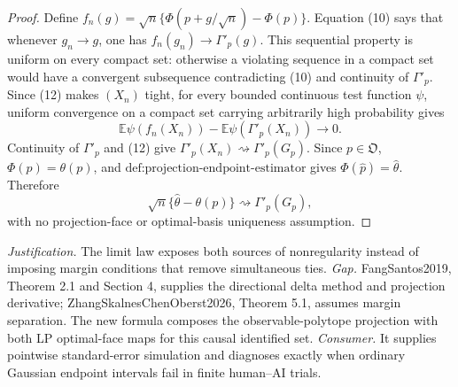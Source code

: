 \documentclass{article}
\begin{document}
\begin{proof}
Define \(f_n(g)=\sqrt n\{\Phi(p+g/\sqrt n)-\Phi(p)\}\).  Equation (10) says that whenever \(g_n\to g\), one has \(f_n(g_n)\to\Gamma'_p(g)\).  This sequential property is uniform on every compact set: otherwise a violating sequence in a compact set would have a convergent subsequence contradicting (10) and continuity of \(\Gamma'_p\).  Since (12) makes \((X_n)\) tight, for every bounded continuous test function \(\psi\), uniform convergence on a compact set carrying arbitrarily high probability gives
\[
\mathbb E\psi(f_n(X_n))-\mathbb E\psi(\Gamma'_p(X_n))\longrightarrow0.
\]
Continuity of \(\Gamma'_p\) and (12) give \(\Gamma'_p(X_n)\rightsquigarrow\Gamma'_p(G_p)\).  Since \(p\in\mathfrak O\), \(\Phi(p)=\theta(p)\), and \(\text{def:projection-endpoint-estimator}\) gives \(\Phi(\widehat p)=\widehat\theta\).  Therefore
\[
\sqrt n\{\widehat\theta-\theta(p)\}
\rightsquigarrow\Gamma'_p(G_p),
\]
with no projection-face or optimal-basis uniqueness assumption.
\end{proof}
\par\smallskip\noindent \textit{Justification.} The limit law exposes both sources of nonregularity instead of imposing margin conditions that remove simultaneous ties. \textit{Gap.} FangSantos2019, Theorem 2.1 and Section 4, supplies the directional delta method and projection derivative; ZhangSkalnesChenOberst2026, Theorem 5.1, assumes margin separation. The new formula composes the observable-polytope projection with both LP optimal-face maps for this causal identified set. \textit{Consumer.} It supplies pointwise standard-error simulation and diagnoses exactly when ordinary Gaussian endpoint intervals fail in finite human--AI trials.
\end{document}
